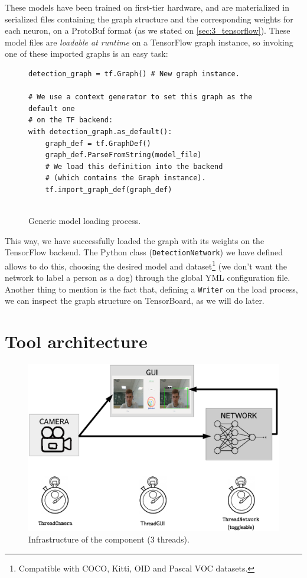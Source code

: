 	
	These models have been trained on first-tier hardware, and are materialized in serialized files containing the graph structure and the corresponding weights for each neuron, on a ProtoBuf format (as we stated on \autoref{sec:3_tensorflow}). These model files are \textit{loadable at runtime} on a TensorFlow graph instance, so invoking one of these imported graphs is an easy task:
	\begin{figure}[h]
		\begin{lstlisting}
detection_graph = tf.Graph() # New graph instance.

# We use a context generator to set this graph as the default one
# on the TF backend:
with detection_graph.as_default():
	graph_def = tf.GraphDef()
	graph_def.ParseFromString(model_file)
	# We load this definition into the backend
	# (which contains the Graph instance).
	tf.import_graph_def(graph_def)
	
		\end{lstlisting}
		\caption{Generic model loading process.}
		\label{fig:5_load_model}
	\end{figure}

	
This way, we have successfully loaded the graph with its weights on the TensorFlow backend. The Python class (\texttt{DetectionNetwork}) we have defined allows to do this, choosing the desired model and dataset\footnote{Compatible with COCO, Kitti, OID and Pascal VOC datasets.} (we don't want the network to label a person as a dog) through the global YML configuration file.\\

Another thing to mention is the fact that, defining a \texttt{Writer} on the load process, we can inspect the graph structure on TensorBoard, as we will do later.

\section{Tool architecture}
	\label{sec:5_node_architecture}
	\begin{figure}[h]
		\centering
		\includegraphics[width=4.5in]{images/objectdetector_infrastructure}
		\caption{Infrastructure of the component (3 threads).}
	\end{figure}
	
